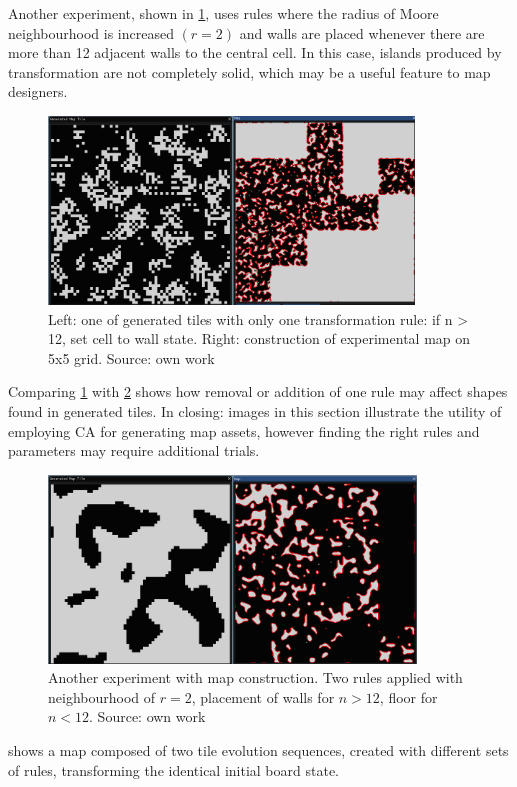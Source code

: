 \documentclass[12pt]{report}
\begin{document}
Another experiment, shown in \cref{fig:r2ex1}, uses rules where the radius of Moore neighbourhood is increased $(r = 2)$ and walls are placed whenever there are more than 12 adjacent walls to the central cell. In this case, islands produced by transformation are not completely solid, which may be a useful feature to map designers.

\begin{figure}[th]
	\centering
	\includegraphics[height=5cm]{images/r2ex1}
	\caption{Left: one of generated tiles with only one transformation rule: if n > 12, set cell to wall state. Right: construction of experimental map on 5x5 grid. Source: own work}
	\label{fig:r2ex1}
\end{figure}

Comparing \cref{fig:r2ex1} with \cref{fig:ex3rst2} shows how removal or addition of one rule may affect shapes found in generated tiles. In closing: images in this section illustrate the utility of employing CA for generating map assets, however finding the right rules and parameters may require additional trials.

\begin{figure}[th]
	\centering
	\includegraphics[height=5cm]{images/ex3rst2}
	\caption{Another experiment with map construction. Two rules applied with neighbourhood of $r = 2$, placement of walls for $n > 12$, floor for $n < 12$. Source: own work}
	\label{fig:ex3rst2}
\end{figure}

 shows a map composed of two tile evolution sequences, created with different sets of rules, transforming the identical initial board state.
\end{document}

